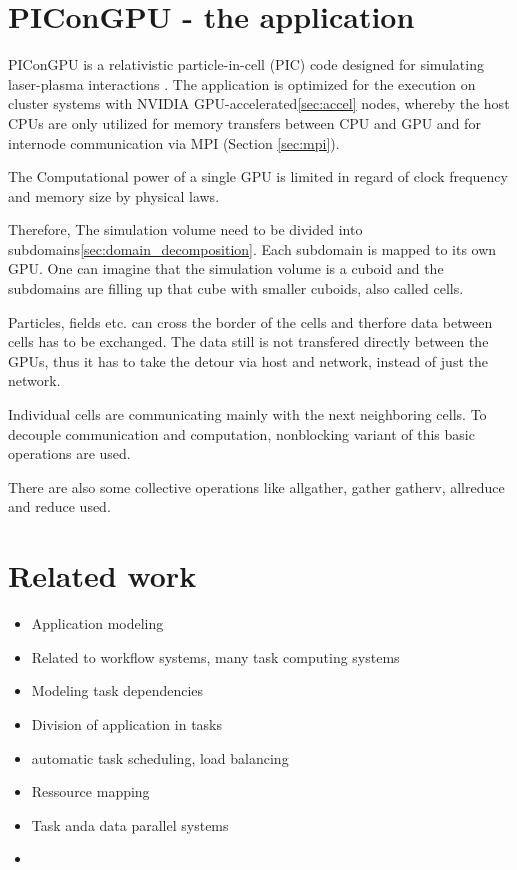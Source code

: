 \section{PIConGPU - the application}
\label{sec:picongpu}
PIConGPU is a relativistic particle-in-cell (PIC) code designed for
simulating laser-plasma interactions \cite{ref:picongpu}. The
application is optimized for the execution on cluster systems with
NVIDIA GPU-accelerated\ref{sec:accel} nodes, whereby the host CPUs are
only utilized for memory transfers between CPU and GPU and for
internode communication via MPI (Section \ref{sec:mpi}).

The Computational power of a single GPU is limited in regard of clock
frequency and memory size by physical laws.

Therefore, The simulation volume need to be divided into
subdomains\ref{sec:domain_decomposition}. Each subdomain is mapped to
its own GPU. One can imagine that the simulation volume is a cuboid
and the subdomains are filling up that cube with smaller cuboids,
also called cells.

Particles, fields etc. can cross the border of the
cells and therfore data between cells has to be
exchanged. The data still is not transfered directly between 
the GPUs, thus it has to take the detour via host and network, instead
of just the network.

Individual cells are communicating mainly with the next
neighboring cells. To decouple communication and computation,
nonblocking variant of this basic operations are used.


There are also some
collective operations like allgather, gather gatherv, allreduce and
reduce used.


\section{Related work}

\begin{itemize}
\item Application modeling
\item Related to workflow systems, many task computing systems
\item Modeling task dependencies
\item Division of application in tasks
\item automatic task scheduling, load balancing
\item Ressource mapping 
\item Task anda data parallel systems
\item 
\end{itemize}

